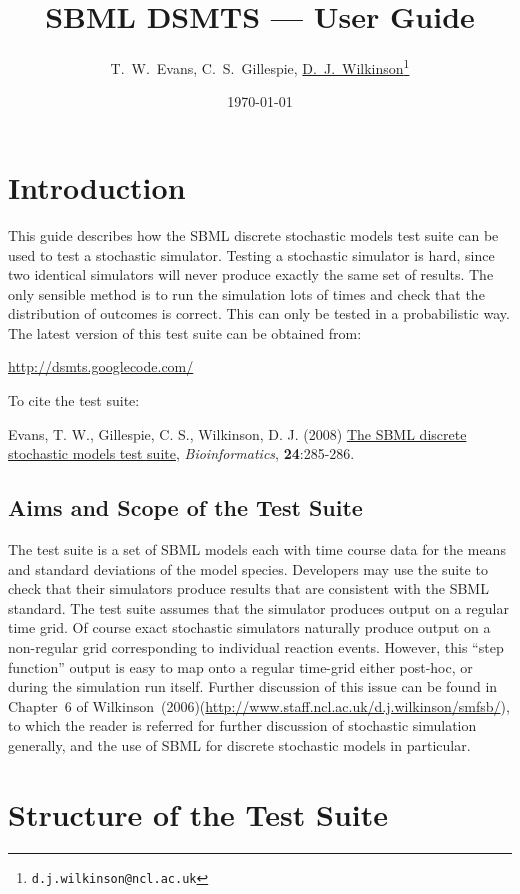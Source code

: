 \documentclass[12pt,a4paper]{article}
\title{SBML DSMTS --- User Guide}
\author{T.~W.~Evans, C.~S.~Gillespie,  \href{http://www.staff.ncl.ac.uk/d.j.wilkinson/}{D.~J.~Wilkinson}\thanks{\texttt{d.j.wilkinson@ncl.ac.uk}}}
\date{\today}
\begin{document}
\sf\maketitle

\section{Introduction} 

This guide describes how the SBML discrete stochastic models test
suite can be used to test a stochastic simulator. Testing a stochastic
simulator is hard, since two identical simulators will never produce
exactly the same set of results. The only sensible method is to run
the simulation lots of times and check that the distribution of
outcomes is correct. This can only be tested in a probabilistic way.
The latest version of this test suite can be obtained from:
\centerline{\url{http://dsmts.googlecode.com/}}

\noindent To cite the test suite:

\noindent
Evans, T. W., Gillespie, C. S., Wilkinson, D. J. (2008) \href{http://dx.doi.org/10.1093/bioinformatics/btm566}{The SBML discrete stochastic models test suite}, \emph{Bioinformatics}, \textbf{24}:285-286.

\subsection{Aims and Scope of the Test Suite}

The test suite is a set of SBML models each with time course data for
the means and standard deviations of the model species. Developers may
use the suite to check that their simulators produce results that are
consistent with the SBML standard. The test suite assumes that the
simulator produces output on a regular time grid. Of course exact
stochastic simulators naturally produce output on a non-regular grid
corresponding to individual reaction events. However, this ``step
function'' output is easy to map onto a regular time-grid either
post-hoc, or during the simulation run itself. Further discussion of
this issue can be found in Chapter~6 of
Wilkinson~(2006)(\url{http://www.staff.ncl.ac.uk/d.j.wilkinson/smfsb/}),
to which the reader is referred for further discussion of stochastic
simulation generally, and the use of SBML for discrete stochastic
models in particular.

\section{Structure of the Test Suite}
\end{document}
